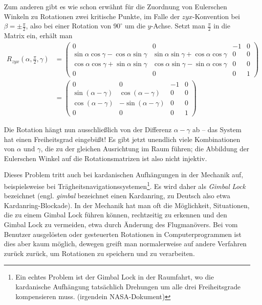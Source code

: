 Zum anderen gibt es wie schon erwähnt für die Zuordnung von Eulerschen Winkeln zu Rotationen zwei kritische Punkte, im Falle der $zyx$-Konvention bei $\beta = \pm \frac{\pi}{2}$, also bei einer Rotation von $90^\circ$ um die $y$-Achse. Setzt man $\frac{\pi}{2}$ in die Matrix ein, erhält man
\begin{equation}
\begin{split}
 R_{zyx}{\left(\alpha, \frac{\pi}{2}, \gamma \right)}
 & = 
 \begin{pmatrix}
  0 & 0 & -1 & 0 \\
  \sin \alpha \cos \gamma - \cos \alpha \sin \gamma & \sin \alpha \sin \gamma + \cos \alpha \cos \gamma & 0 & 0 \\
  \cos \alpha \cos \gamma + \sin \alpha \sin \gamma & \cos \alpha \sin \gamma - \sin \alpha \cos \gamma & 0 & 0 \\
  0 & 0 & 0 & 1
 \end{pmatrix} \\
 & = 
 \begin{pmatrix}
  0 & 0 & -1 & 0 \\
  \sin ( \alpha - \gamma ) &  \cos ( \alpha - \gamma ) & 0 & 0 \\
  \cos ( \alpha - \gamma ) & -\sin ( \alpha - \gamma ) & 0 & 0 \\
  0 & 0 & 0 & 1
 \end{pmatrix}
\end{split}
\end{equation}

Die Rotation hängt nun ausschließlich von der Differenz $\alpha - \gamma$ ab -- das System hat einen Freiheitsgrad eingebüßt! Es gibt jetzt unendlich viele Kombinationen von $\alpha$ und $\gamma$, die zu der gleichen Ausrichtung im Raum führen; die Abbildung der Eulerschen Winkel auf die Rotationsmatrizen ist also nicht injektiv.

Dieses Problem tritt auch bei kardanischen Aufhängungen in der Mechanik auf, beispielsweise bei Trägheitsnavigationssystemen\footnote{Ein echtes Problem ist der Gimbal Lock in der Raumfahrt, wo die kardanische Aufhängung tatsächlich Drehungen um alle drei Freiheitsgrade kompensieren muss. (\vgl irgendein NASA-Dokument)}. Es wird daher als \emph{Gimbal Lock} bezeichnet (engl. \emph{gimbal} bezeichnet einen Kardanring, zu Deutsch also etwa Kardanring-Blockade). In der Mechanik hat man oft die Möglichkeit, Situationen, die zu einem Gimbal Lock führen können, rechtzeitig zu erkennen und den Gimbal Lock zu vermeiden, etwa durch Änderung des Flugmanövers. Bei vom Benutzer ausgelösten oder gesteuerten Rotationen in Computerprogrammen ist dies aber kaum möglich, dewegen greift man normalerweise auf andere Verfahren zurück zurück, um Rotationen zu speichern und zu verarbeiten.

